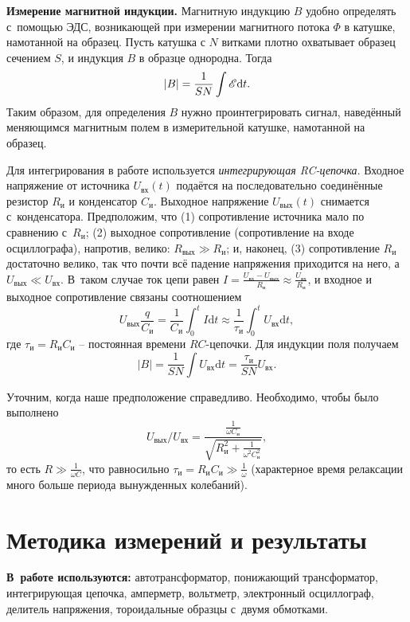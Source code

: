 \documentclass[12pt, a4paper]{article}
\begin{document}
\textbf{Измерение магнитной индукции.} Магнитную индукцию $B$ удобно определять с~помощью ЭДС, возникающей при измерении магнитного потока $\Phi$ в катушке, намотанной на образец. Пусть катушка с $N$ витками плотно охватывает образец сечением $S$, и индукция $B$ в образце однородна. Тогда\[\left|B\right|=\frac{1}{SN}\int\mathscr{E}\text{d}t.\]Таким образом, для определения $B$ нужно проинтегрировать сигнал, наведённый меняющимся магнитным полем в измерительной катушке, намотанной на образец.

Для интегрирования в работе используется \textit{интегрирующая RC-цепочка}.
Входное напряжение от источника $U_{\text{вх}}(t)$ подаётся на последовательно соединённые резистор $R_{\text{и}}$ и конденсатор $C_{\text{и}}$.
Выходное напряжение $U_{\text{вых}}(t)$ снимается с~конденсатора.
Предположим, что (1) сопротивление источника мало по сравнению с~$R_{\text{и}}$;
(2) выходное сопротивление (сопротивление на входе осциллографа), напротив, велико:
$R_{\text{вых}}\gg R_{\text{и}}$; и, наконец, (3) сопротивление $R_{\text{и}}$ достаточно велико,
так что почти всё падение напряжения приходится на него, а $U_{\text{вых}}\ll U_{\text{вх}}$.
В~таком случае ток цепи равен $I=\frac{U_{\text{вх}}-U_{\text{вых}}}{R_{\text{и}}}\approx\frac{U_{\text{вх}}}{R_{\text{и}}}$,
и входное и выходное сопротивление связаны соотношением\[U_{\text{вых}}\frac{q}{C_{\text{и}}}=\frac{1}{C_{\text{и}}}\int_0^tI\text{d}t\approx\frac{1}{\tau_{\text{и}}}\int_0^tU_{\text{вх}}\text{d}t,\]где $\tau_{\text{и}}=R_{\text{и}}C_{\text{и}}$ -- постоянная времени $RC$-цепочки.
Для индукции поля получаем\[\left|B\right|=\frac{1}{SN}\int U_{\text{вх}}\text{d}t=\frac{\tau_{\text{и}}}{SN}U_{\text{вх}}.\]

Уточним, когда наше предположение справедливо. Необходимо, чтобы было выполнено \[U_\text{вых} / U_\text{вх} = \frac{\frac{1}{\omega C_\text{и}}}{\sqrt{R_\text{и}^2 + \frac{1}{\omega^2 C_\text{и}^2}}},\]
то есть $R \gg \frac{1}{\omega C}$, что равносильно $\tau_\text{и} = R_\text{и}C_\text{и} \gg \frac{1}{\omega}$ (характерное время релаксации много больше периода вынужденных колебаний).

\section{Методика измерений и результаты}
\textbf{В~работе используются:} автотрансформатор, понижающий трансформатор,
интегрирующая цепочка, амперметр, вольтметр, электронный осциллограф, делитель напряжения,
тороидальные образцы с~двумя об­мотками.
\end{document}
